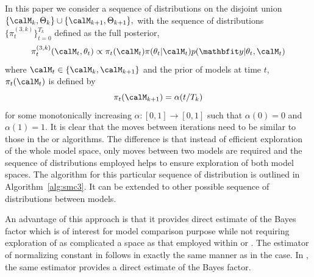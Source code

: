 In this paper we consider a sequence of distributions on the disjoint union
$\{\calM_k,\Theta_k\}\cup\{\calM_{k+1},\Theta_{k+1}\},$ with the sequence of
distributions $\{\pi_t^{(3,k)}\}_{t=0}^{T_k}$ defined as the full posterior,
\begin{equation}
  \pi_t^{(3,k)}(\calM_t,\theta_t) \propto
  \pi_t(\calM_t) \pi(\theta_t|\calM_t) p(\data|\theta_t,\calM_t)
\end{equation}
where $\calM_t\in\{\calM_k,\calM_{k+1}\}$ and the prior of models at time $t$,
$\pi_t(\calM_t)$ is defined by
\begin{equation}
  \pi_t(\calM_{k+1}) = \alpha(t/T_k)
  \label{eq:smc3_prior}
\end{equation}
for some monotonically increasing $\alpha:[0,1]\to[0,1]$ such that $\alpha(0)
= 0$ and $\alpha(1) = 1$. It is clear that the \mcmc moves between iterations
need to be similar to those in the \rjmcmc or \smc[1] algorithms. The
difference is that instead of efficient exploration of the whole model space,
only moves between two models are required and the sequence of distributions
employed helps to ensure exploration of both model spaces. The algorithm for
this particular sequence of distribution is outlined in
Algorithm~\ref{alg:smc3}. It can be extended to other possible sequence of
distributions between models.

An advantage of this approach is that it provides direct estimate of the Bayes
factor which is of interest for model comparison purpose while not requiring
exploration of as complicated a space as that employed within \rjmcmc or
\smc[1]. The estimator of normalizing constant in \smc[3] follows in
exactly the same manner as in the \smc[2] case. In \smc[3], the same estimator
provides a direct estimate of the Bayes factor.

